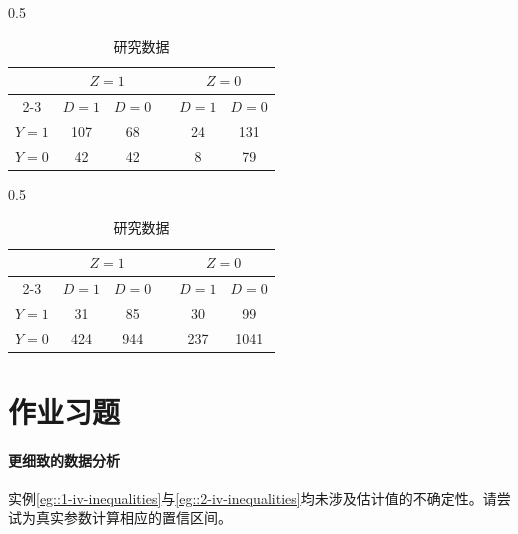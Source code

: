  \begin{table}[t]
\caption{二元数据与IV不等式}
\begin{center}
\begin{subtable}{0.5\textwidth}
\caption{ \citet{improve2014endovascular}研究数据}
\begin{tabular}{cccccc} 
\hline 
      &   \multicolumn{2}{c}{$Z=1$}  &  &  \multicolumn{2}{c}{$Z=0$}  \\  \cline{2-3} \cline{5-6} 
      & $D=1$  &  $D=0$           &       &  $D=1$  &  $D=0$\\
 $Y=1$ &   107    &      68         &      &    24       &    131        \\
 $Y=0$ &   42    &     42            &      &     8         &     79           \\  
 \hline
\end{tabular}
\label{tab::data1}
\end{subtable}%
\vspace{0.1in}
\begin{subtable}{0.5\textwidth}
\caption{ \citet{hirano2000assessing}研究数据}
\begin{tabular}{cccccc}
\hline 
      &   \multicolumn{2}{c}{$Z=1$}  &  &  \multicolumn{2}{c}{$Z=0$}  \\  \cline{2-3} \cline{5-6} 
      & $D=1$  &  $D=0$           &       &  $D=1$  &  $D=0$\\
 $Y=1$ &   31    &     85         &      &     30       &    99       \\
 $Y=0$ &   424   &     944            &      &     237         &    1041           \\  
 \hline
\end{tabular}
\label{tab::data2}
\end{subtable}
\end{center}
\end{table}%

 
 
\section{作业习题}

\paragraph{更细致的数据分析}\label{hw::more-data-binary}

实例\ref{eg::1-iv-inequalities}与\ref{eg::2-iv-inequalities}均未涉及估计值的不确定性。请尝试为真实参数计算相应的置信区间。 
 



